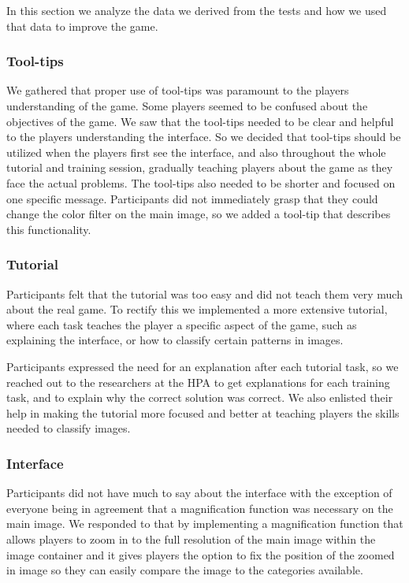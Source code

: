In this section we analyze the data we derived from the tests and how we used that data to improve the game.

\subsubsection{Tool-tips}
We gathered that proper use of tool-tips was paramount to the players understanding of the game. Some players seemed to be confused about the objectives of the game. We saw that the tool-tips needed to be clear and helpful to the players understanding the interface. So we decided that tool-tips should be utilized when the players first see the interface, and also throughout the whole tutorial and training session, gradually teaching players about the game as they face the actual problems. The tool-tips also needed to be shorter and focused on one specific message. Participants did not immediately grasp that they could change the color filter on the main image, so we added a tool-tip that describes this functionality.

\subsubsection{Tutorial}
Participants felt that the tutorial was too easy and did not teach them very much about the real game. To rectify this we implemented a more extensive tutorial, where each task teaches the player a specific aspect of the game, such as explaining the interface, or how to classify certain patterns in images. 

Participants expressed the need for an explanation after each tutorial task, so we reached out to the researchers at the HPA to get explanations for each training task, and to explain why the correct solution was correct. We also enlisted their help in making the tutorial more focused and better at teaching players the skills needed to classify images.

\subsubsection{Interface}
Participants did not have much to say about the interface with the exception of everyone being in agreement that a magnification function was necessary on the main image. We responded to that by implementing a magnification function that allows players to zoom in to the full resolution of the main image within the image container and it gives players the option to fix the position of the zoomed in image so they can easily compare the image to the categories available.

